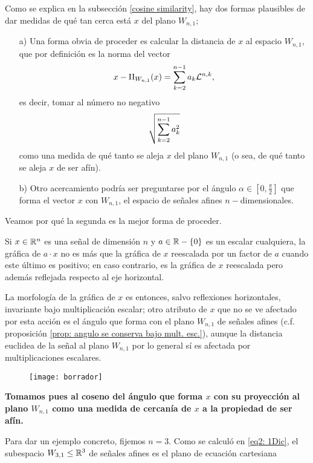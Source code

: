 {Como se explica en la subsección \ref{cosine similarity}, hay
dos formas plausibles de dar medidas de qué tan cerca está
$x$ del plano $W_{n,1}$;

\begin{itemize}
\item[a)] Una forma obvia de proceder es calcular
la distancia de $x$ al espacio $W_{n,1}$, que por definición es 
la norma
del vector 
\[
x - \Pi_{W_{n,1}}(x)= \sum\limits_{k=2}^{n-1}a_{k} \mathcal{L}^{n, k},
\]
es decir, tomar al número no negativo
\[
\sqrt{ \sum\limits_{k=2}^{n-1}a_{k}^{2}}
\]
como una medida de qué tanto se aleja $x$ del plano $W_{n,1}$
(o sea, de qué tanto se aleja $x$ de ser afín).

\item[b)] Otro acercamiento podría ser preguntarse por
el ángulo $\alpha \in [0, \frac{\pi}{2}]$ 
que forma el vector $x$ con
$W_{n,1}$, el espacio de señales afines $n-$dimensionales.
\end{itemize}
Veamos por qué la segunda
es la mejor forma de proceder.

Si $x \in \mathbb{R}^{n}$ es una señal de dimensión $n$ y 
$a \in \mathbb{R}-\{ 0 \}$ es un escalar cualquiera,
la gráfica de $a \cdot x$ no es más que la gráfica 
de $x$ reescalada por un factor de $a$ cuando este
último es positivo; en caso contrario, es la gráfica
de $x$ reescalada pero además reflejada respecto al eje
horizontal.

La morfología de la gráfica de $x$ es entonces,
salvo reflexiones horizontales, invariante bajo multiplicación
escalar; otro atributo de $x$ que no se ve afectado por esta acción
es el ángulo que forma con el plano $W_{n,1}$ de señales afines
(c.f. proposición \ref{prop: angulo se conserva bajo mult. esc.}), 
aunque la distancia euclidea de la señal
al plano $W_{n,1}$ por lo general sí es afectada por multiplicaciones escalares.


\begin{figure}[H]
	\centering
	\texttt{[image: borrador]}
\end{figure}

\textbf{Tomamos pues al coseno del ángulo que forma $x$ con su proyección
al plano $W_{n,1}$ como una medida de cercanía de $x$ a la propiedad de 
ser afín.}


Para dar un ejemplo concreto, fijemos $n=3$.
Como se calculó en \eqref{eq2: 1Dic},
el subespacio $W_{3,1} \leq \mathbb{R}^{3}$ de señales afines es el plano
de ecuación cartesiana

}
